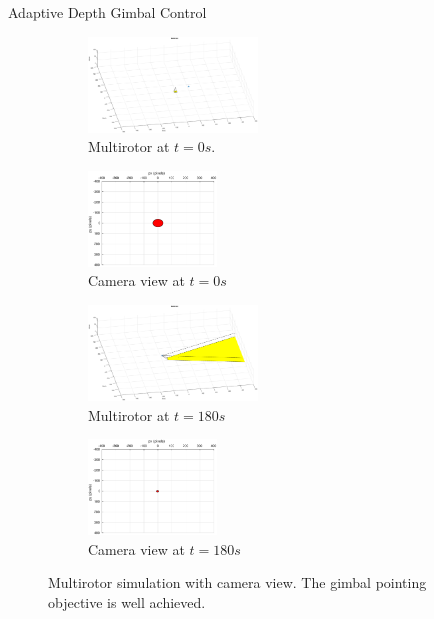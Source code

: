 \documentclass[9pt]{beamer}
\newenvironment{figure*}%
{\begin{figure}}
{\end{figure}}
\begin{document}
\begin{frame}{Adaptive Depth Gimbal Control}
\begin{figure}[htbp]
	\centering
	\begin{subfigure}{0.5\textwidth}
		\centering
		\includegraphics[height=1in]{chapter2/uav_adaptive_0s}
		\caption{Multirotor at $t=0s$.}
	\end{subfigure}%
	\begin{subfigure}{0.5\textwidth}
		\centering
		\includegraphics[height=1in]{chapter2/camera_adaptive_0s}
		\caption{Camera view at $t=0s$}
	\end{subfigure}
	\begin{subfigure}{0.5\textwidth}
		\centering
		\includegraphics[height=1in]{chapter2/uav_adaptive_180s}
		\caption{Multirotor at $t=180s$}
	\end{subfigure}%
	\begin{subfigure}{0.5\textwidth}
		\centering
		\includegraphics[height=1in]{chapter2/camera_adaptive_180s}
		\caption{Camera view at $t=180s$}
	\end{subfigure}					
	\caption{Multirotor simulation with camera view. The gimbal pointing objective is well achieved.}
	\label{uav_adaptive}
\end{figure}
\end{frame}
\end{document}
